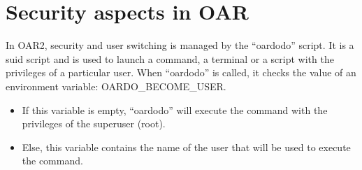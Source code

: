 \documentclass[a4paper,10pt]{article}
\begin{document}
\section*{Security aspects in OAR}
In OAR2, security and user switching is managed by the ``oardodo'' script.
It is a suid script and is used to launch a command, a terminal or a script with the privileges of a particular user.
When ``oardodo'' is called, it checks the value of an environment variable: OARDO\_BECOME\_USER.
\begin{itemize}
 \item If this variable is empty, ``oardodo'' will execute the command with the privileges of the superuser (root).
 \item Else, this variable contains the name of the user that will be used to execute the command.\\
\end{itemize}
\end{document}
